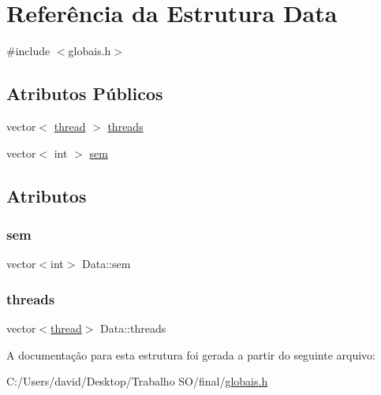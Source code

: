 \hypertarget{struct_data}{}\section{Referência da Estrutura Data}
\label{struct_data}


{\ttfamily \#include $<$globais.\+h$>$}

\subsection*{Atributos Públicos}
\begin{DoxyCompactItemize}
\item 
vector$<$ \hyperlink{globais_8h_aa3e43a238de7ec11cb3bc5ac81be09d0}{thread} $>$ \hyperlink{struct_data_a95c9fc40c60873c70624b8185897e34b}{threads}
\item 
vector$<$ int $>$ \hyperlink{struct_data_a1d3dfd5572acaab409284f8ac8ac6ab5}{sem}
\end{DoxyCompactItemize}


\subsection{Atributos}
\mbox{\label{struct_data_a1d3dfd5572acaab409284f8ac8ac6ab5}} 
\subsubsection{\texorpdfstring{sem}{sem}}
{\footnotesize\ttfamily vector$<$int$>$ Data\+::sem}

\mbox{\label{struct_data_a95c9fc40c60873c70624b8185897e34b}} 
\subsubsection{\texorpdfstring{threads}{threads}}
{\footnotesize\ttfamily vector$<$\hyperlink{globais_8h_aa3e43a238de7ec11cb3bc5ac81be09d0}{thread}$>$ Data\+::threads}



A documentação para esta estrutura foi gerada a partir do seguinte arquivo\+:\begin{DoxyCompactItemize}
\item 
C\+:/\+Users/david/\+Desktop/\+Trabalho S\+O/final/\hyperlink{globais_8h}{globais.\+h}\end{DoxyCompactItemize}
